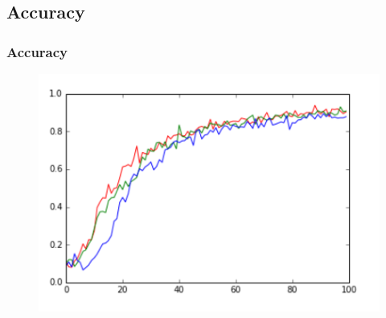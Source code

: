 \subsection{Accuracy}
\begin{frame}
    \frametitle{Accuracy}
    \begin{figure}
		\includegraphics[scale=0.5]{figure/accuracy.PNG}
    \end{figure}
\end{frame}

